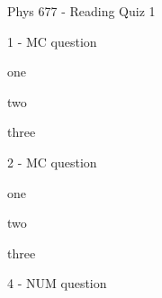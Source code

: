 \documentclass[letterpaper,10pt]{article}
\begin{document}
\begin{center}
{\Large Phys 677 - Reading Quiz 1}
\end{center}


\begin{compactenum}
    \begin{minipage}{\linewidth}
    \item 1 - MC question
    \begin{compactenum}
        \item \label{ans:mc:683}one
        \item two
        \item three
    \end{compactenum}

    \end{minipage}

    \vspace{10pt}

    \begin{minipage}{\linewidth}
    \item 2 - MC question
    \begin{compactenum}
        \item one
        \item \label{ans:mc:170}two
        \item \label{ans:mc:996}three
    \end{compactenum}

    \end{minipage}

    \vspace{10pt}

    \begin{minipage}{\linewidth}
    \item 4 - NUM question

    \label{ans:num:414}

    \end{minipage}

    \vspace{10pt}

\end{compactenum}
\end{document}
